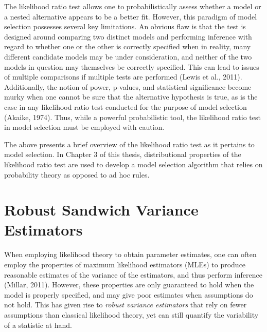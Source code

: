		The likelihood ratio test allows one to probabilistically assess whether a model or a nested alternative appears to be a better fit. However, this paradigm of model selection possesses
		several key limitations. An obvious flaw is that the test is designed around comparing two distinct models and performing inference with regard to whether one or the other is 
		correctly specified when in reality, many different candidate models may be under consideration, and neither of the two models in question may themselves be correctly specified. 
		This can lead to issues of multiple comparisons if multiple tests are performed (Lewis et al., 2011). Additionally, the notion of power, p-values, and statistical significance 
		become murky when one cannot be sure that the alternative hypothesis is true, as is the case in any likelihood ratio test conducted for the purpose of model selection (Akaike, 1974).
		Thus, while a powerful probabilistic tool, the likelihood ratio test in model selection must be employed with caution.

		The above presents a brief overview of the likelihood ratio test as it pertains to model selection. In Chapter 3 of this thesis, distributional properties of the likelihood ratio test are
		used to develop a model selection algorithm that relies on probability theory as opposed to ad hoc rules.

		\section{Robust Sandwich Variance Estimators}

		When employing likelihood theory to obtain parameter estimates, one can often employ the properties of maximum likelihood estimators (MLEs) to produce reasonable estimates of the variance of the
		estimators, and thus perform inference (Millar, 2011). However, these properties are only guaranteed to hold when the model is properly specified, and may give poor estimates when assumptions
		do not hold. This has given rise to \textit{robust variance estimators} that rely on fewer assumptions than classical likelihood theory, yet can still quantify the variability of a statistic
		at hand.

